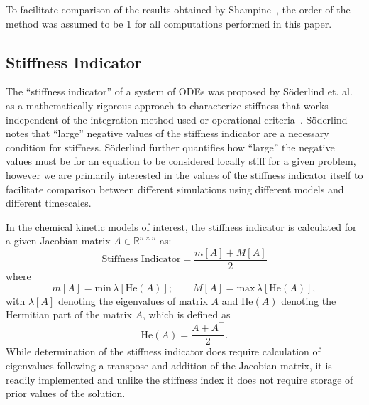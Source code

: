\documentclass[12pt]{ussci}
\begin{document}
To facilitate comparison of the results obtained by Shampine~\cite{Shampine1985}, the order of the method was assumed to be 1 for all computations performed in this paper.

\subsection{Stiffness Indicator}
The ``stiffness indicator'' of a system of ODEs was proposed by S{\"o}derlind et. al. as a mathematically rigorous approach to characterize stiffness that works independent of the integration method used or operational criteria~\cite{Soderlind2014}.
S{\"o}derlind notes that ``large'' negative values of the stiffness indicator are a necessary condition for stiffness.
S{\"o}derlind further quantifies how ``large'' the negative values must be for an equation to be considered locally stiff for a given problem, however we are primarily interested in the values of the stiffness indicator itself to facilitate comparison between different simulations using different models and different timescales.

In the chemical kinetic models of interest, the stiffness indicator is calculated for a given Jacobian matrix $A \in \mathbb{R}^{n \times n}$ as:
\begin{equation}
	\textrm{Stiffness Indicator} = \frac{m[A] + M[A]}{2}
\end{equation}
where
\begin{equation}
	m[A] = \textrm{min}\,\lambda[\textrm{He}(A)];\qquad M[A] = \textrm{max}\,\lambda[\textrm{He}(A)],
\end{equation}
with $\lambda [A]$ denoting the eigenvalues of matrix $A$ and $\textrm{He}(A)$ denoting the Hermitian part of the matrix $A$, which is defined as
\begin{equation}
	\textrm{He}(A) = \frac{A + A^\intercal}{2}.
\end{equation}
While determination of the stiffness indicator does require calculation of eigenvalues following a transpose and addition of the Jacobian matrix, it is readily implemented and unlike the stiffness index it does not require storage of prior values of the solution.
\end{document}
